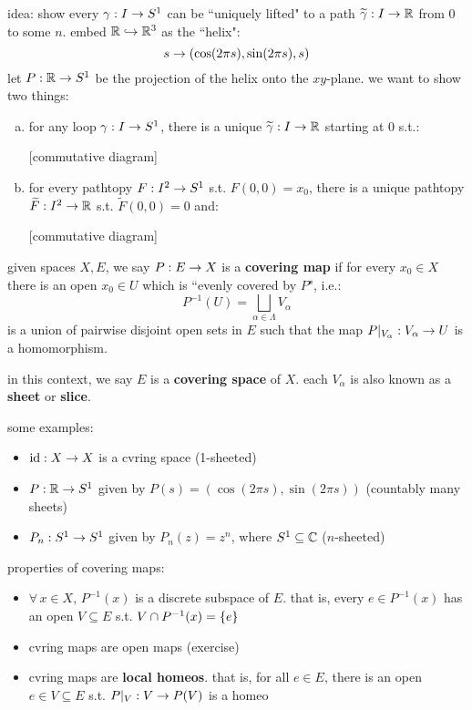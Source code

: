 idea: show every $\gamma:I\rightarrow S^{1}$ can be ``uniquely lifted" to a path $\widetilde{\gamma}:I\rightarrow\mathbb{R}$
from $0$ to some $n$.
embed $\mathbb{R}\hookrightarrow\mathbb{R}^{3}$ as the ``helix":
\begin{equation*}
    s\rightarrow(\cos(2\pi s),\sin(2\pi s),s)
\end{equation*}
let $P:\mathbb{R}\rightarrow S^{1}$ be the projection of the helix onto the $xy$-plane.
we want to show two things:
\begin{enumerate}[(a)]
    \item for any loop $\gamma:I\rightarrow S^{1}$, there is a unique $\widetilde{\gamma}:I\rightarrow\mathbb{R}$ starting
        at $0$ s.t.:

        [commutative diagram]

    \item for every pathtopy $F:I^{2}\rightarrow S^{1}$ s.t. $F(0,0)=x_{0}$, there is a unique
        pathtopy $\widetilde{F}:I^{2}\rightarrow\mathbb{R}$ s.t. $\tilde{F}(0,0)=0$ and:

        [commutative diagram]
\end{enumerate}

\begin{defn}
    given spaces $X,E$, we say $P:E\rightarrow X$ is a \textbf{covering map} if for every
    $x_{0}\in X$ there is an open $x_{0}\in U$ which is ``evenly covered by $P$", i.e.:
    \begin{equation*}
        P^{-1}(U)=\bigsqcup_{\alpha\in\Lambda}V_{\alpha}
    \end{equation*}
    is a union of pairwise disjoint open sets in $E$ such that the map
    $P\rvert_{V_{\alpha}}:V_{\alpha}\rightarrow U$ is a homomorphism.

    in this context, we say $E$ is a \textbf{covering space} of $X$.
    each $V_{\alpha}$ is also known as a \textbf{sheet} or \textbf{slice}.
\end{defn}
some examples:
\begin{itemize}
    \item $\textrm{id}:X\rightarrow X$ is a cvring space (1-sheeted)
    \item $P:\mathbb{R}\rightarrow S^{1}$ given by $P(s)=(\cos(2\pi s),\sin(2\pi s))$ (countably many sheets)
    \item $P_{n}:S^{1}\rightarrow S^{1}$ given by $P_{n}(z)=z^{n}$, where $S^{1}\subseteq\mathbb{C}$
        ($n$-sheeted)
\end{itemize}

properties of covering maps:
\begin{itemize}
    \item $\forall \, x\in X$, $P^{-1}(x)$ is a discrete subspace of $E$.
        that is, every $e\in P^{-1}(x)$ has an open $V\subseteq E$ s.t. $V\cap P^{-1}(x)=\left\{{e}\right\}$
    \item cvring maps are open maps (exercise)
    \item cvring maps are \textbf{local homeos}. that is, for all
        $e\in E$, there is an open $e\in V\subseteq E$ s.t. $P\rvert_{V}:V\rightarrow P(V)$ is a homeo
\end{itemize}

